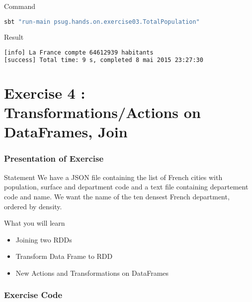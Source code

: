 \documentclass[slidetop,9pt,utf8]{beamer}
\begin{document}
\begin{CJK}{UTF8}{gbsn}
\begin{frame}[fragile]
  \begin{block}{Command}
    \begin{lstlisting}[language=bash, style=terminal]
sbt "run-main psug.hands.on.exercise03.TotalPopulation"
    \end{lstlisting}
  \end{block}

  \begin{block}{Result}
    \begin{lstlisting}[language=bash, style=terminal]
[info] La France compte 64612939 habitants
[success] Total time: 9 s, completed 8 mai 2015 23:27:30
    \end{lstlisting}
  \end{block}

\end{frame}

\section{Exercise 4 : Transformations/Actions on DataFrames, Join}

\begin{frame}
  \frametitle{Presentation of Exercise}

  \begin{block}{Statement}
    We have a JSON file containing the list of French cities with population, surface and department code and a text file containing departement code and name. We want the name of the ten densest French department, ordered by density.
  \end{block}

  \begin{block}{What you will learn}
    \begin{itemize}
      \item Joining two RDDs
      \item Transform Data Frame to RDD
      \item New Actions and Transformations on DataFrames
    \end{itemize}
  \end{block}

\end{frame}

\begin{frame}
  \frametitle{Exercise Code}

  


\end{frame}
\end{CJK}
\end{document}
